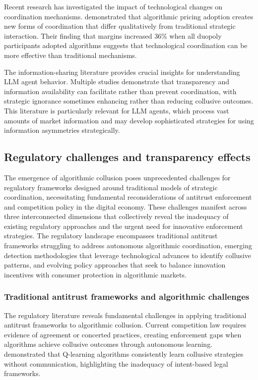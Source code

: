 Recent research has investigated the impact of technological changes on coordination mechanisms. \textcite{assad_algorithmic_2024} demonstrated that algorithmic pricing adoption creates new forms of coordination that differ qualitatively from traditional strategic interaction. Their finding that margins increased 36\% when all duopoly participants adopted algorithms suggests that technological coordination can be more effective than traditional mechanisms.

The information-sharing literature provides crucial insights for understanding LLM agent behavior. Multiple studies demonstrate that transparency and information availability can facilitate rather than prevent coordination, with strategic ignorance sometimes enhancing rather than reducing collusive outcomes. This literature is particularly relevant for LLM agents, which process vast amounts of market information and may develop sophisticated strategies for using information asymmetries strategically.

\subsection{Regulatory challenges and transparency effects}

The emergence of algorithmic collusion poses unprecedented challenges for regulatory frameworks designed around traditional models of strategic coordination, necessitating fundamental reconsiderations of antitrust enforcement and competition policy in the digital economy. These challenges manifest across three interconnected dimensions that collectively reveal the inadequacy of existing regulatory approaches and the urgent need for innovative enforcement strategies. The regulatory landscape encompasses traditional antitrust frameworks struggling to address autonomous algorithmic coordination, emerging detection methodologies that leverage technological advances to identify collusive patterns, and evolving policy approaches that seek to balance innovation incentives with consumer protection in algorithmic markets.

\subsubsection*{Traditional antitrust frameworks and algorithmic challenges}

The regulatory literature reveals fundamental challenges in applying traditional antitrust frameworks to algorithmic collusion. Current competition law requires evidence of agreement or concerted practices, creating enforcement gaps when algorithms achieve collusive outcomes through autonomous learning. \textcite{calvano_artificial_2020} demonstrated that Q-learning algorithms consistently learn collusive strategies without communication, highlighting the inadequacy of intent-based legal frameworks.

